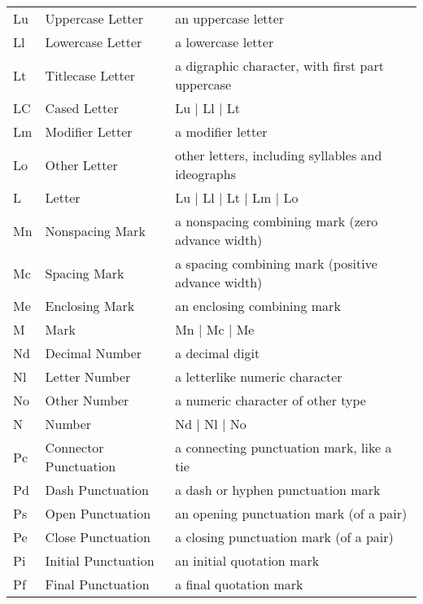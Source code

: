 \documentclass[12pt]{article}
\begin{document}
\begin{tabular}{lll}
	Lu & Uppercase Letter      & an uppercase letter                               \\
	Ll & Lowercase Letter      & a lowercase letter                                \\
	Lt & Titlecase Letter      & a digraphic character, with first part uppercase  \\
	LC & Cased Letter          & Lu | Ll | Lt                                      \\
	Lm & Modifier Letter       & a modifier letter                                 \\
	Lo & Other Letter          & other letters, including syllables and ideographs \\
	L  & Letter                & Lu | Ll | Lt | Lm | Lo                            \\
	Mn & Nonspacing Mark       & a nonspacing combining mark (zero advance width)  \\
	Mc & Spacing Mark          & a spacing combining mark (positive advance width) \\
	Me & Enclosing Mark        & an enclosing combining mark                       \\
	M  & Mark                  & Mn | Mc | Me                                      \\
	Nd & Decimal Number        & a decimal digit                                   \\
	Nl & Letter Number         & a letterlike numeric character                    \\
	No & Other Number          & a numeric character of other type                 \\
	N  & Number                & Nd | Nl | No                                      \\
	Pc & Connector Punctuation & a connecting punctuation mark, like a tie         \\
	Pd & Dash Punctuation      & a dash or hyphen punctuation mark                 \\
	Ps & Open Punctuation      & an opening punctuation mark (of a pair)           \\
	Pe & Close Punctuation     & a closing punctuation mark (of a pair)            \\
	Pi & Initial Punctuation   & an initial quotation mark                         \\
	Pf & Final Punctuation     & a final quotation mark                            \\

\end{tabular}
\end{document}
